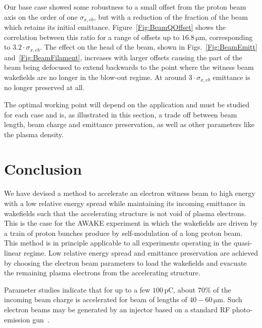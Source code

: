\documentclass[aps,prstab,reprint,amsmath,amssymb,groupedaddress]{revtex4-1}
\newcommand{\unit}[1]{\,\mathrm{#1}}
\begin{document}
Our base case showed some robustness to a small offset from the proton beam axis on the order of one $\sigma_{x,eb}$, but with a reduction of the fraction of the beam which retains its initial emittance. Figure~\ref{Fig:BeamQOffset} shows the correlation between this ratio for a range of offsets up to $16.8\unit{\mu m}$, corresponding to $3.2\cdot\sigma_{x,eb}$. The effect on the head of the beam, shown in Figs.~\ref{Fig:BeamEmitt} and~\ref{Fig:BeamFilament}, increases with larger offsets causing the part of the beam being defocused to extend backwards to the point where the witness beam wakefields are no longer in the blow-out regime. At around $3\cdot\sigma_{x,eb}$ emittance is no longer preserved at all.

The optimal working point will depend on the application and must be studied for each case and is, as illustrated in this section, a trade off between beam length, beam charge and emittance preservation, as well as other parameters like the plasma density.   

\section{Conclusion}\label{S:C}

We have devised a method to accelerate an electron witness beam to high energy with a low relative energy spread while maintaining its incoming emittance in wakefields such that the accelerating structure is not void of plasma electrons. This is the case for the AWAKE experiment in which the wakefields are driven by a train of proton bunches produce by self-modulation of a long proton beam. This method is in principle applicable to all experiments operating in the quasi-linear regime. Low relative energy spread and emittance preservation are achieved by choosing the electron beam parameters to load the wakefields and evacuate the remaining plasma electrons from the accelerating structure.
 
Parameter studies indicate that for up to a few $100\unit{pC}$, about $70\%$ of the incoming beam charge is accelerated for beam of lengths of $40-60\unit{\mu m}$. Such electron beams may be generated by an injector based on a standard RF photo-emission gun~\cite{doebert:corr}.
\end{document}

